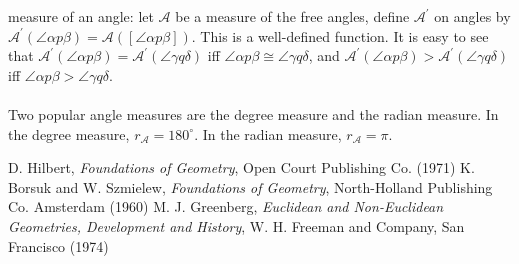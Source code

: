 \documentclass[12pt]{article}
\begin{document}
measure of an angle: let $\mathcal{A}$ be a measure of the free
angles, define $\mathcal{A}^{\prime}$ on angles by
$\mathcal{A}^{\prime}(\angle \alpha p\beta)=\mathcal{A}([\angle
\alpha p\beta])$.  This is a well-defined function.  It is easy to
see that $\mathcal{A}^{\prime}(\angle \alpha p\beta)=
\mathcal{A}^{\prime}(\angle \gamma q\delta)$ iff $\angle \alpha
p\beta\cong\angle \gamma q\delta$, and $\mathcal{A}^{\prime}(\angle
\alpha p\beta)>\mathcal{A}^{\prime}(\angle \gamma q\delta)$ iff
$\angle \alpha p\beta>\angle \gamma q\delta$.
\\\\
Two popular angle measures are the degree measure and the radian
measure.  In the degree measure, $r_\mathcal{A}=180^{\circ}$.  In
the radian measure, $r_\mathcal{A}=\pi$.

\begin{thebibliography}{6}
 D. Hilbert, {\it Foundations of Geometry}, Open Court Publishing Co. (1971)
 K. Borsuk and W. Szmielew, {\it Foundations of Geometry}, North-Holland Publishing Co. Amsterdam (1960)
 M. J. Greenberg, {\it Euclidean and Non-Euclidean Geometries, Development and History}, W. H. Freeman and Company, San Francisco (1974)
\end{thebibliography}
\end{document}

